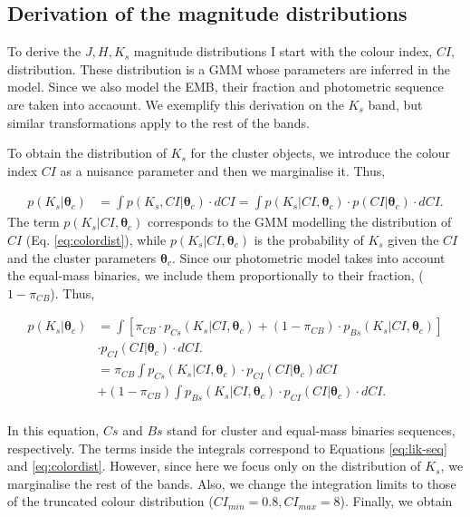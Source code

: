 \subsection{Derivation of the magnitude distributions}
\label{subsect:deriveluminosity}
To derive the $J,H,K_s$ magnitude distributions I start with the colour index, $CI$, distribution. These distribution is a GMM whose parameters are inferred in the model. Since we also model the EMB, their fraction and photometric sequence are taken into accaount. We exemplify this derivation on the $K_s$ band, but similar transformations apply to the rest of the bands. 

To obtain the distribution of $K_s$ for the cluster objects, we introduce the colour index $CI$ as a nuisance parameter and then we marginalise it. Thus, 

\begin{align}
p(K_s | \boldsymbol{\theta}_c) & = \int p(K_s,CI | \boldsymbol{\theta}_c) \cdot dCI =  \int p(K_s | CI ,\boldsymbol{\theta}_c) \cdot p(CI|\boldsymbol{\theta}_c)\cdot dCI. \nonumber
\end{align}
The term $p(K_s | CI ,\boldsymbol{\theta}_c)$ corresponds to the GMM modelling the distribution of $CI$ (Eq. \ref{eq:colordist}), while $p(K_s | CI ,\boldsymbol{\theta}_c)$ is the probability of $K_s$ given the $CI$ and the cluster parameters $\boldsymbol{\theta}_c$. Since our photometric model takes into account the equal-mass binaries, we include them proportionally to their fraction, ($1-\pi_{CB}$). Thus,

\begin{align}
p(K_s | \boldsymbol{\theta}_c) & =  \int \left[\pi_{CB}\cdot p_{Cs}(K_s| CI, \boldsymbol{\theta}_c) + (1-\pi_{CB})\cdot p_{Bs}(K_s| CI, \boldsymbol{\theta}_c)\right]\nonumber \\& \cdot p_{CI}(CI|\boldsymbol{\theta}_c)\cdot dCI. \nonumber \\
& =   \pi_{CB} \int p_{Cs}(K_s| CI, \boldsymbol{\theta}_c) \cdot p_{CI}(CI|\boldsymbol{\theta}_c) dCI \nonumber \\
&+ (1-\pi_{CB})\int p_{Bs}(K_s| CI, \boldsymbol{\theta}_c) \cdot p_{CI}(CI|\boldsymbol{\theta}_c)\cdot  dCI. \nonumber \\
\end{align}

In this equation, $Cs$ and $Bs$ stand for cluster and equal-mass binaries sequences, respectively. The terms inside the integrals correspond to Equations \ref{eq:lik-seq} and \ref{eq:colordist}. However, since here we focus only on the distribution of $K_s$, we marginalise the rest of the bands. Also, we change the integration limits to those of the truncated colour distribution ($CI_{min}=0.8, CI_{max}=8$). Finally, we obtain


